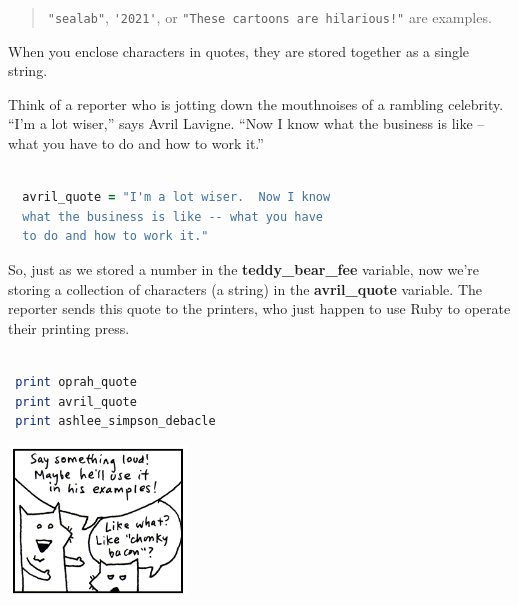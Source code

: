 \documentclass[10pt,twoside]{report}
\begin{document}
\begin{quote}
\lstinline[breaklines=true]|"sealab"|,
\lstinline[breaklines=true]|'2021'|, or
\lstinline[breaklines=true]|"These cartoons are hilarious!"| are
examples.\end{quote}


When you enclose characters in quotes, they are stored together as a
single string.

Think of a reporter who is jotting down the mouthnoises of a rambling
celebrity.  ``I'm a lot wiser,'' says Avril Lavigne.  ``Now I know
what the business is like -- what you have to do and how to work it.''


\begin{lstlisting}[basicstyle=\ttfamily\color{basiccolor},
    commentstyle = \ttfamily\color{commentcolor},
    keywordstyle=\ttfamily\color{keywordscolor},
    stringstyle=\color{stringcolor},
    language=Ruby,
    basicstyle=\small\ttfamily,
    showstringspaces=false,
  ]

  avril_quote = "I'm a lot wiser.  Now I know
  what the business is like -- what you have
  to do and how to work it."

\end{lstlisting}


So, just as we stored a number in the {\bf teddy\_bear\_fee} variable,
now we're storing a collection of characters (a string) in the {\bf
  avril\_quote} variable.  The reporter sends this quote to the
printers, who just happen to use Ruby to operate their printing press.


\begin{lstlisting}[basicstyle=\ttfamily\color{basiccolor},
    commentstyle = \ttfamily\color{commentcolor},
    keywordstyle=\ttfamily\color{keywordscolor},
    stringstyle=\color{stringcolor},
    language=Ruby,
    basicstyle=\small\ttfamily,
    showstringspaces=false,
  ]

 print oprah_quote
 print avril_quote
 print ashlee_simpson_debacle

\end{lstlisting}

	\includegraphics[width=0.3575\textwidth]{cache/9.png}
\end{document}
